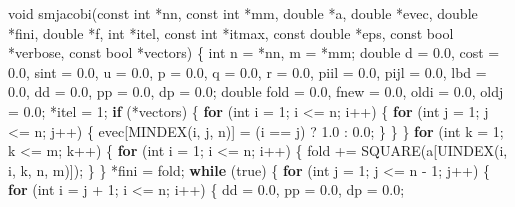 \documentclass[12pt,]{article}
\newenvironment{Shaded}{\begin{snugshade}}{\end{snugshade}}
\newcommand{\ControlFlowTok}[1]{\textcolor[rgb]{0.13,0.29,0.53}{\textbf{#1}}}
\newcommand{\DataTypeTok}[1]{\textcolor[rgb]{0.13,0.29,0.53}{#1}}
\newcommand{\DecValTok}[1]{\textcolor[rgb]{0.00,0.00,0.81}{#1}}
\newcommand{\FloatTok}[1]{\textcolor[rgb]{0.00,0.00,0.81}{#1}}
\newcommand{\NormalTok}[1]{#1}
\begin{document}
\begin{Shaded}
\begin{Highlighting}[]
{{{{{{\DataTypeTok{void}\NormalTok{ smjacobi(}\DataTypeTok{const} \DataTypeTok{int}\NormalTok{ *nn, }\DataTypeTok{const} \DataTypeTok{int}\NormalTok{ *mm, }\DataTypeTok{double}\NormalTok{ *a, }\DataTypeTok{double}\NormalTok{ *evec,}
              \DataTypeTok{double}\NormalTok{ *fini, }\DataTypeTok{double}\NormalTok{ *f, }\DataTypeTok{int}\NormalTok{ *itel, }\DataTypeTok{const} \DataTypeTok{int}\NormalTok{ *itmax,}
              \DataTypeTok{const} \DataTypeTok{double}\NormalTok{ *eps, }\DataTypeTok{const} \DataTypeTok{bool}\NormalTok{ *verbose, }\DataTypeTok{const} \DataTypeTok{bool}\NormalTok{ *vectors) \{}
  \DataTypeTok{int}\NormalTok{ n = *nn, m = *mm;}
  \DataTypeTok{double}\NormalTok{ d = }\FloatTok{0.0}\NormalTok{, cost = }\FloatTok{0.0}\NormalTok{, sint = }\FloatTok{0.0}\NormalTok{, u = }\FloatTok{0.0}\NormalTok{, p = }\FloatTok{0.0}\NormalTok{, q = }\FloatTok{0.0}\NormalTok{, r = }\FloatTok{0.0}\NormalTok{,}
\NormalTok{         piil = }\FloatTok{0.0}\NormalTok{, pijl = }\FloatTok{0.0}\NormalTok{, lbd = }\FloatTok{0.0}\NormalTok{, dd = }\FloatTok{0.0}\NormalTok{, pp = }\FloatTok{0.0}\NormalTok{, dp = }\FloatTok{0.0}\NormalTok{;}
  \DataTypeTok{double}\NormalTok{ fold = }\FloatTok{0.0}\NormalTok{, fnew = }\FloatTok{0.0}\NormalTok{, oldi = }\FloatTok{0.0}\NormalTok{, oldj = }\FloatTok{0.0}\NormalTok{;}
\NormalTok{  *itel = }\DecValTok{1}\NormalTok{;}
  \ControlFlowTok{if}\NormalTok{ (*vectors) \{}
    \ControlFlowTok{for}\NormalTok{ (}\DataTypeTok{int}\NormalTok{ i = }\DecValTok{1}\NormalTok{; i <= n; i++) \{}
      \ControlFlowTok{for}\NormalTok{ (}\DataTypeTok{int}\NormalTok{ j = }\DecValTok{1}\NormalTok{; j <= n; j++) \{}
\NormalTok{        evec[MINDEX(i, j, n)] = (i == j) ? }\FloatTok{1.0}\NormalTok{ : }\FloatTok{0.0}\NormalTok{;}
\NormalTok{      \}}
\NormalTok{    \}}
\NormalTok{  \}}
  \ControlFlowTok{for}\NormalTok{ (}\DataTypeTok{int}\NormalTok{ k = }\DecValTok{1}\NormalTok{; k <= m; k++) \{}
    \ControlFlowTok{for}\NormalTok{ (}\DataTypeTok{int}\NormalTok{ i = }\DecValTok{1}\NormalTok{; i <= n; i++) \{}
\NormalTok{      fold += SQUARE(a[UINDEX(i, i, k, n, m)]);}
\NormalTok{    \}}
\NormalTok{  \}}
\NormalTok{  *fini = fold;}
  \ControlFlowTok{while}\NormalTok{ (true) \{}
    \ControlFlowTok{for}\NormalTok{ (}\DataTypeTok{int}\NormalTok{ j = }\DecValTok{1}\NormalTok{; j <= n - }\DecValTok{1}\NormalTok{; j++) \{}
      \ControlFlowTok{for}\NormalTok{ (}\DataTypeTok{int}\NormalTok{ i = j + }\DecValTok{1}\NormalTok{; i <= n; i++) \{}
\NormalTok{        dd = }\FloatTok{0.0}\NormalTok{, pp = }\FloatTok{0.0}\NormalTok{, dp = }\FloatTok{0.0}\NormalTok{;}
}}}}}}
\end{Highlighting}
\end{Shaded}
\end{document}
